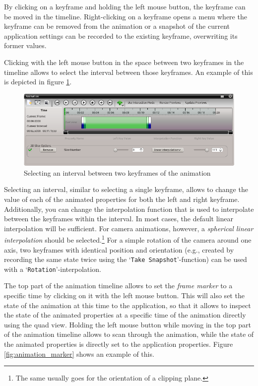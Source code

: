 By clicking on a keyframe and holding the left mouse button, the keyframe can be moved in the timeline. Right-clicking on a keyframe opens a menu where the keyframe 
can be removed from the animation or a snapshot of the current application settings can be recorded to the existing keyframe, overwriting its former values.

Clicking with the left mouse button in the space between two keyframes in the timeline allows to select the interval between those keyframes. 
An example of this is depicted in figure \ref{fig:animation_interval}.
\begin{figure}[!htb]
 \centering
 \includegraphics[scale=0.5,keepaspectratio=true]{./images/animation_interval.png}
 \caption{Selecting an interval between two keyframes of the animation}
 \label{fig:animation_interval}
\end{figure}
Selecting an interval, similar to selecting a single keyframe, allows to change the value of each of the animated properties for both the left and right keyframe.
Additionally, you can change the interpolation function that is used to interpolate between the keyframes within the interval. In most cases, the default linear 
interpolation will be sufficient. For camera animations, however, a \emph{spherical linear interpolation} should be selected.\footnote{The same
usually goes for the orientation of a clipping plane.} For a simple rotation of the camera around one axis, two keyframes with identical position and orientation (e.g., created by recording the same state twice using the `\verb|Take Snapshot|'-function) can be used with a `\verb|Rotation|'-interpolation.

The top part of the animation timeline allows to set the \emph{frame marker} to a specific time by clicking on it with the left mouse button. This will also set
the state of the animation at this time to the application, so that it allows to inspect the state of the animated properties at a specific time of the animation
directly using the quad view. Holding the left mouse button while moving in the top part of the animation timeline allows to scan through the animation, while
the state of the animated properties is directly set to the application properties. Figure \ref{fig:animation_marker} shows an example of this.

